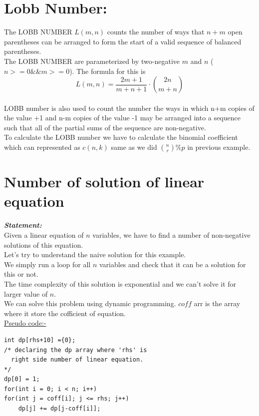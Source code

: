 \documentclass[12pt]{book}
\begin{document}
\section{Lobb Number:}
The LOBB NUMBER $L(m, n)$ counts the number of ways that $n+m$ open parentheses can be arranged to form the start of a valid sequence of balanced parentheses.\\

The LOBB NUMBER are parameterized by two-negative $m$ and $n$ ($n>=0 \&\& m>=0$). The formula for this is\\
\[L(m, n) = \frac{2m + 1}{m + n + 1} \cdot {2n \choose m + n}\]\\

LOBB number is also used to count the number the ways in which n+m copies of the value +1 and n-m copies of the value -1 may be arranged into a sequence such that all of the partial sums of the sequence are non-negative.\\
To calculate the LOBB number we have to calculate the binomial coefficient which can represented as $c(n, k)$ same as we did ${n \choose r} \% p$ in previous example.\\

\section{Number of solution of linear equation}
\textbf{\textit{Statement:}}\\
Given a linear equation of $n$ variables, we have to find a number of non-negative solutions of this equation.\\

Let’s try to understand the naive solution for this example.\\
We simply run a loop for all $n$ variables and check that it can be a solution for this or not.\\
The time complexity of this solution is exponential and we can't solve it for larger value of $n$.\\

We can solve this problem using dynamic programming.  $coff$ arr is the array where it store the cofficient of equation.\\

\underline{Pseudo code:-}\\
 \begin{lstlisting}
int dp[rhs+10] ={0};
/* declaring the dp array where 'rhs' is
  right side number of linear equation.
*/
dp[0] = 1;
for(int i = 0; i < n; i++)
for(int j = coff[i]; j <= rhs; j++)
    dp[j] += dp[j-coff[i]];
\end{lstlisting}
\end{document}
